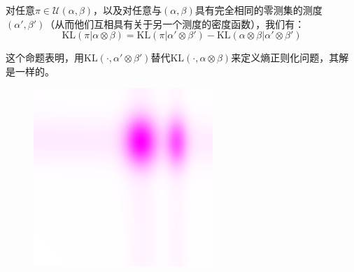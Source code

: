 \documentclass[cn,10pt,math=newtx,citestyle=gb7714-2015,bibstyle=gb7714-2015]{elegantbook}
\begin{document}
\begin{proposition}
对任意$\pi\in\mathcal{U}(\alpha,\beta)$，以及对任意与$(\alpha,\beta)$具有完全相同的零测集的测度$(\alpha',\beta')$（从而他们互相具有关于另一个测度的密度函数），我们有：
\begin{equation*}
    \text{KL}(\pi|\alpha\otimes \beta) = \text{KL}(\pi|\alpha'\otimes \beta') - \text{KL}(\alpha\otimes \beta|\alpha'\otimes \beta')
\end{equation*}
\end{proposition}

这个命题表明，用$\text{KL}(\cdot, \alpha'\otimes \beta')$替代$\text{KL}(\cdot, \alpha\otimes \beta)$来定义熵正则化问题，其解是一样的。

\begin{figure}[H]
	\centering
	\begin{minipage}{0.20\linewidth}
		\centering
		\begin{mdframed}
		    \includegraphics[width=\linewidth]{figure/fig4.2/evol-img-1.png}
		\end{mdframed}
	\end{minipage}
	\begin{minipage}{0.20\linewidth}
		\centering
		\begin{mdframed}

\end{mdframed}
\end{minipage}
\end{figure}
\end{document}

